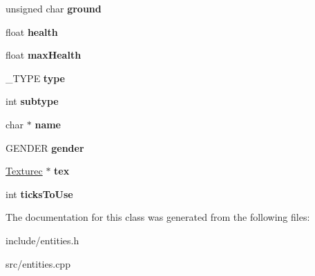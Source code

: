 \begin{DoxyCompactItemize}
\item 
\hypertarget{classEntity_a2c8b0ce760cf77a2ba9b8d1c37209fd7}{}unsigned char {\bfseries ground}\label{classEntity_a2c8b0ce760cf77a2ba9b8d1c37209fd7}

\item 
\hypertarget{classEntity_a854c9b7a8ed49aae4538734df4915727}{}float {\bfseries health}\label{classEntity_a854c9b7a8ed49aae4538734df4915727}

\item 
\hypertarget{classEntity_a59499f3d9d7def4f5a5cab1c9c30f570}{}float {\bfseries max\+Health}\label{classEntity_a59499f3d9d7def4f5a5cab1c9c30f570}

\item 
\hypertarget{classEntity_a85be7fcdcdedefeccf05daf80d3bcc73}{}\+\_\+\+T\+Y\+P\+E {\bfseries type}\label{classEntity_a85be7fcdcdedefeccf05daf80d3bcc73}

\item 
\hypertarget{classEntity_a80eea5b24c587dc4ae6beba6c8b3d5b5}{}int {\bfseries subtype}\label{classEntity_a80eea5b24c587dc4ae6beba6c8b3d5b5}

\item 
\hypertarget{classEntity_a861f653e2ffbe97c0deed7ab85eb7ce6}{}char $\ast$ {\bfseries name}\label{classEntity_a861f653e2ffbe97c0deed7ab85eb7ce6}

\item 
\hypertarget{classEntity_a89bc767973827fd8512643f8d2e05837}{}G\+E\+N\+D\+E\+R {\bfseries gender}\label{classEntity_a89bc767973827fd8512643f8d2e05837}

\item 
\hypertarget{classEntity_af664044f029b81c097cb3e6e0d987fb3}{}\hyperlink{classTexturec}{Texturec} $\ast$ {\bfseries tex}\label{classEntity_af664044f029b81c097cb3e6e0d987fb3}

\item 
\hypertarget{classEntity_a9cb580e6e12bace5a86c955e25f8825c}{}int {\bfseries ticks\+To\+Use}\label{classEntity_a9cb580e6e12bace5a86c955e25f8825c}

\end{DoxyCompactItemize}


The documentation for this class was generated from the following files\+:\begin{DoxyCompactItemize}
\item 
include/entities.\+h\item 
src/entities.\+cpp\end{DoxyCompactItemize}
